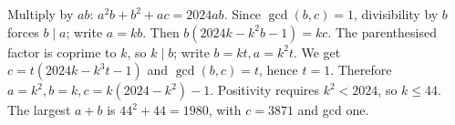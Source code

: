 Multiply by $ab$: $a^2b+b^2+ac=2024ab$. Since $\gcd(b,c)=1$, divisibility by $b$ forces $b\mid a$; write $a=kb$. Then $b(2024k-k^2b-1)=kc$. The parenthesised factor is coprime to $k$, so $k\mid b$; write $b=kt,a=k^2t$. We get $c=t(2024k-k^3t-1)$ and $\gcd(b,c)=t$, hence $t=1$. Therefore $a=k^2,b=k,c=k(2024-k^2)-1$. Positivity requires $k^2<2024$, so $k\le44$. The largest $a+b$ is $44^2+44=\boxed{1980}$, with $c=3871$ and gcd one.
